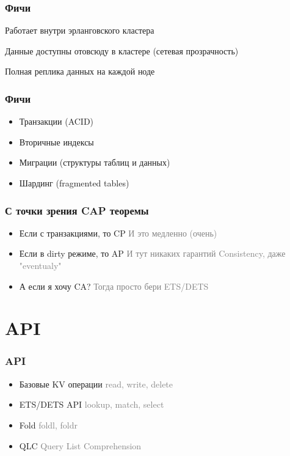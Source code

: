 \documentclass[10pt]{beamer}
\begin{document}
\begin{frame}
\frametitle{Фичи}
\centering
Работает внутри эрланговского кластера
\par
\bigskip
Данные доступны отовсюду в кластере (сетевая прозрачность)
\par
\bigskip
Полная реплика данных на каждой ноде
\end{frame}

\begin{frame}
\frametitle{Фичи}
\begin{itemize}
\item Транзакции (ACID)
\item Вторичные индексы
\item Миграции (структуры таблиц и данных)
\item Шардинг (fragmented tables)
\end{itemize}
\end{frame}

\begin{frame}
\frametitle{С точки зрения CAP теоремы}
\begin{itemize}[<+->]
\item Если с транзакциями, то CP\newline
  \textcolor{gray}{И это медленно (очень)}
\item Если в dirty режиме, то AP\newline
  \textcolor{gray}{И тут никаких гарантий Consistency, даже "eventualy"}
\item А если я хочу CA?\newline
  \textcolor{gray}{Тогда просто бери ETS/DETS}
\end{itemize}
\end{frame}

\section{API}

\begin{frame}
\frametitle{API}
\begin{itemize}[<+->]
\item Базовые KV операции\newline
  \textcolor{gray}{read, write, delete}
\item ETS/DETS API\newline
  \textcolor{gray}{lookup, match, select}
\item Fold\newline
  \textcolor{gray}{foldl, foldr}
\item QLC\newline
  \textcolor{gray}{Query List Comprehension}
\end{itemize}
\end{frame}
\end{document}
